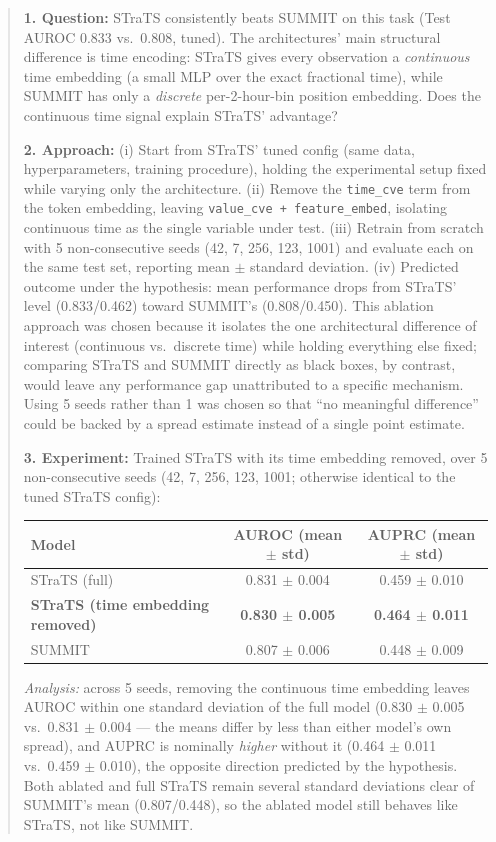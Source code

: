 \documentclass{article}
\begin{document}
\begin{quote}
\textbf{1. Question:} STraTS consistently beats SUMMIT on this task (Test AUROC 0.833 vs.\ 0.808, tuned). The architectures' main structural difference is time encoding: STraTS gives every observation a \emph{continuous} time embedding (a small MLP over the exact fractional time), while SUMMIT has only a \emph{discrete} per-2-hour-bin position embedding. Does the continuous time signal explain STraTS' advantage?

\textbf{2. Approach:}
(i) Start from STraTS' tuned config (same data, hyperparameters, training procedure), holding the experimental setup fixed while varying only the architecture.
(ii) Remove the \texttt{time\_cve} term from the token embedding, leaving \texttt{value\_cve + feature\_embed}, isolating continuous time as the single variable under test.
(iii) Retrain from scratch with 5 non-consecutive seeds (42, 7, 256, 123, 1001) and evaluate each on the same test set, reporting mean $\pm$ standard deviation.
(iv) Predicted outcome under the hypothesis: mean performance drops from STraTS' level (0.833/0.462) toward SUMMIT's (0.808/0.450).
This ablation approach was chosen because it isolates the one architectural difference of interest (continuous vs.\ discrete time) while holding everything else fixed; comparing STraTS and SUMMIT directly as black boxes, by contrast, would leave any performance gap unattributed to a specific mechanism. Using 5 seeds rather than 1 was chosen so that ``no meaningful difference'' could be backed by a spread estimate instead of a single point estimate.

\textbf{3. Experiment:} Trained STraTS with its time embedding removed, over 5 non-consecutive seeds (42, 7, 256, 123, 1001; otherwise identical to the tuned STraTS config):

\begin{center}
\small
\begin{tabular}{lcc}
\hline
Model & AUROC (mean $\pm$ std) & AUPRC (mean $\pm$ std) \\
\hline
STraTS (full) & 0.831 $\pm$ 0.004 & 0.459 $\pm$ 0.010 \\
\textbf{STraTS (time embedding removed)} & \textbf{0.830 $\pm$ 0.005} & \textbf{0.464 $\pm$ 0.011} \\
SUMMIT & 0.807 $\pm$ 0.006 & 0.448 $\pm$ 0.009 \\
\hline
\end{tabular}
\end{center}

\emph{Analysis:} across 5 seeds, removing the continuous time embedding leaves AUROC within one standard deviation of the full model (0.830 $\pm$ 0.005 vs.\ 0.831 $\pm$ 0.004 --- the means differ by less than either model's own spread), and AUPRC is nominally \emph{higher} without it (0.464 $\pm$ 0.011 vs.\ 0.459 $\pm$ 0.010), the opposite direction predicted by the hypothesis. Both ablated and full STraTS remain several standard deviations clear of SUMMIT's mean (0.807/0.448), so the ablated model still behaves like STraTS, not like SUMMIT.


\end{quote}
\end{document}
